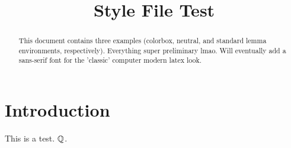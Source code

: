 \documentclass{scrartcl}
\title{Style File Test}
\begin{document}
\maketitle

\begin{abstract}
    This document contains three examples (colorbox, neutral, and standard lemma environments, respectively). Everything super preliminary lmao. Will eventually add a sans-serif font for the 'classic' computer modern latex look.

\end{abstract}

\section{Introduction}
This is a test. $\mathbb Q$.
\end{document}
